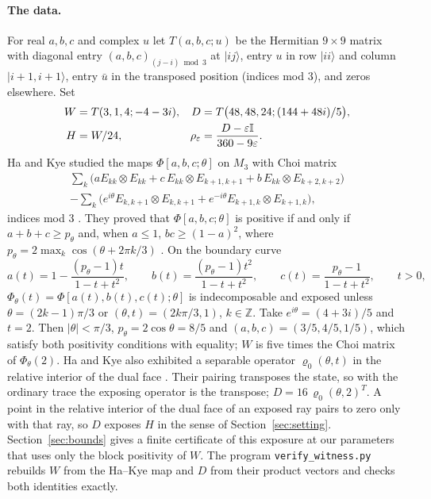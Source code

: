 \documentclass[11pt,a4paper]{article}
\theoremstyle{definition}\newtheorem{definition}[theorem]{Definition}\newtheorem*{conj}{Conjecture 9 of Shen, Chen and Bian}\newtheorem{remark}[theorem]{Remark}
\newcommand{\eps}{\varepsilon}\newcommand{\ket}[1]{\lvert #1\rangle}\newcommand{\bra}[1]{\langle #1\rvert}\newcommand{\F}{\mathrm F}\newcommand{\op}{\mathrm{op}}\newcommand{\C}{\mathbb C}
\begin{document}
\paragraph{The data.}
For real $a,b,c$ and complex $u$ let $T(a,b,c;u)$ be the Hermitian $9\times9$ matrix with diagonal entry $(a,b,c)_{(j-i)\bmod3}$ at $\ket{ij}$, entry $u$ in row $\ket{ii}$ and column $\ket{i+1,i+1}$, entry $\bar u$ in the transposed position (indices mod $3$), and zeros elsewhere. Set
\begin{align}
 W&=T(3,1,4;-4-3i),  &D&=T\bigl(48,48,24;(144+48i)/5\bigr),\label{eq:data}\\
 H&=W/24, &\rho_\eps&=\frac{D-\eps\id}{360-9\eps}.\label{eq:state}
\end{align}
Ha and Kye studied the maps $\Phi[a,b,c;\theta]$ on $M_3$ with Choi matrix
\begin{multline*}
 \sum_{k}\bigl(a E_{kk}\otimes E_{kk}+c\,E_{kk}\otimes E_{k+1,k+1}+b\,E_{kk}\otimes E_{k+2,k+2}\bigr)\\
 -\sum_{k}\bigl(e^{i\theta}E_{k,k+1}\otimes E_{k,k+1}+e^{-i\theta}E_{k+1,k}\otimes E_{k+1,k}\bigr),
\end{multline*}
indices mod 3 \cite{hakye,hk12}. They proved that $\Phi[a,b,c;\theta]$ is positive if and only if $a+b+c\geq p_\theta$ and, when $a\leq1$, $bc\geq(1-a)^2$, where $p_\theta=2\max_{k}\cos(\theta+2\pi k/3)$ \cite[Theorem 2.2]{hk12}. On the boundary curve
\begin{equation}\label{eq:family}
 a(t)=1-\frac{(p_\theta-1)t}{1-t+t^2},\qquad b(t)=\frac{(p_\theta-1)t^2}{1-t+t^2},\qquad c(t)=\frac{p_\theta-1}{1-t+t^2},\qquad t>0,
\end{equation}
$\Phi_\theta(t)=\Phi[a(t),b(t),c(t);\theta]$ is indecomposable \cite{hk12} and exposed \cite[Theorem 3.2]{hakye} unless $\theta=(2k-1)\pi/3$ or $(\theta,t)=(2k\pi/3,1)$, $k\in\mathbb Z$. Take $e^{i\theta}=(4+3i)/5$ and $t=2$. Then $|\theta|<\pi/3$, $p_\theta=2\cos\theta=8/5$ and $(a,b,c)=(3/5,4/5,1/5)$, which satisfy both positivity conditions with equality; $W$ is five times the Choi matrix of $\Phi_\theta(2)$. Ha and Kye also exhibited a separable operator $\varrho_0(\theta,t)$ in the relative interior of the dual face \cite[Section 4]{hakye}. Their pairing transposes the state, so with the ordinary trace the exposing operator is the transpose; $D=16\,\varrho_0(\theta,2)^T$. A point in the relative interior of the dual face of an exposed ray pairs to zero only with that ray, so $D$ exposes $H$ in the sense of Section~\ref{sec:setting}. Section~\ref{sec:bounds} gives a finite certificate of this exposure at our parameters that uses only the block positivity of $W$. The program \texttt{verify\_witness.py} rebuilds $W$ from the Ha--Kye map and $D$ from their product vectors and checks both identities exactly.
\end{document}
